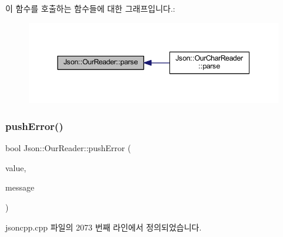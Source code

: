 이 함수를 호출하는 함수들에 대한 그래프입니다.\+:\nopagebreak
\begin{figure}[H]
\begin{center}
\leavevmode
\includegraphics[width=345pt]{class_json_1_1_our_reader_aba4f8749aab7f02ec17f107e392caf80_icgraph}
\end{center}
\end{figure}
\mbox{\label{class_json_1_1_our_reader_a700e9d8e0977fa7e0375d26690d7025f}} 
\subsubsection{\texorpdfstring{push\+Error()}{pushError()}\hspace{0.1cm}{\footnotesize\ttfamily [1/2]}}
{\footnotesize\ttfamily bool Json\+::\+Our\+Reader\+::push\+Error (\begin{DoxyParamCaption}\item[{const \hyperlink{class_json_1_1_value}{Value} \&}]{value,  }\item[{const \hyperlink{json_8h_a1e723f95759de062585bc4a8fd3fa4be}{J\+S\+O\+N\+C\+P\+P\+\_\+\+S\+T\+R\+I\+NG} \&}]{message }\end{DoxyParamCaption})}



jsoncpp.\+cpp 파일의 2073 번째 라인에서 정의되었습니다.


